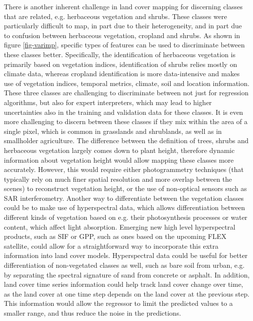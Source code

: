 \documentclass[review,authoryear,3p]{elsarticle}
\begin{document}
There is another inherent challenge in land cover mapping for discerning classes that are related, e.g. herbaceous vegetation and shrubs.
These classes were particularly difficult to map, in part due to their heterogeneity, and in part due to confusion between herbaceous vegetation, cropland and shrubs.
As shown in figure \ref{fig-varimp}, specific types of features can be used to discriminate between these classes better.
Specifically, the identification of herbaceous vegetation is primarily based on vegetation indices, identification of shrubs relies mostly on climate data, whereas cropland identification is more data-intensive and makes use of vegetation indices, temporal metrics, climate, soil and location information.
These three classes are challenging to discriminate between not just for regression algorithms, but also for expert interpreters, which may lead to higher uncertainties also in the training and validation data for these classes.
It is even more challenging to discern between these classes if they mix within the area of a single pixel, which is common in grasslands and shrublands, as well as in smallholder agriculture.
The difference between the definition of trees, shrubs and herbaceous vegetation largely comes down to plant height, therefore dynamic information about vegetation height would allow mapping these classes more accurately.
However, this would require either photogrammetry techniques (that typically rely on much finer spatial resolution and more overlap between the scenes) to reconstruct vegetation height, or the use of non-optical sensors such as \gls{SAR} interferometry.
Another way to differentiate between the vegetation classes could be to make use of hyperspectral data, which allows differentiation between different kinds of vegetation based on e.g. their photosynthesis processes or water content, which affect light absorption.
Emerging new high level hyperspectral products, such as \gls{SIF} or \gls{GPP}, such as ones based on the upcoming FLEX satellite, could allow for a straightforward way to incorporate this extra information into land cover models.
Hyperspectral data could be useful for better differentiation of non-vegetated classes as well, such as bare soil from urban, e.g. by separating the spectral signature of sand from concrete or asphalt.
In addition, land cover time series information could help track land cover change over time, as the land cover at one time step depends on the land cover at the previous step.
This information would allow the regressor to limit the predicted values to a smaller range, and thus reduce the noise in the predictions.
\end{document}
